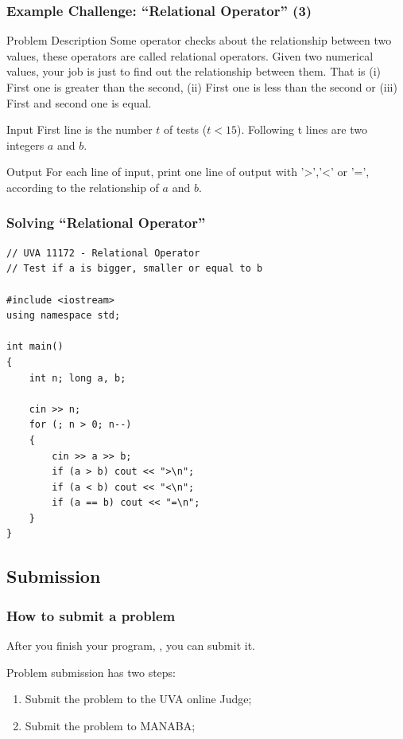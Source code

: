 \documentclass{beamer}
\begin{document}
\begin{frame}
  \frametitle{Example Challenge: ``Relational Operator'' (3)}
  
  \begin{block}{Problem Description}
    {\small 
      Some operator checks about the relationship between two values,
      these operators are called relational operators. Given two
      numerical values, your job is just to find out the relationship
      between them. That is (i) First one is greater than the second,
      (ii) First one is less than the second or (iii) First and second
      one is equal.
    }
  \end{block}
  \begin{block}{Input}
    {\small
      First line is the number $t$ of tests ($t < 15$). Following t lines 
      are two integers $a$ and $b$.
    }
  \end{block}
  \begin{block}{Output}
    {\small
      For each line of input, print one line of output with '>','<' or '=', 
      according to the relationship of $a$ and $b$.
    }
  \end{block}
\end{frame}



\begin{frame}
  \frametitle{Solving ``Relational Operator''}
    
\begin{block}{}
{\smaller
\begin{verbatim}
// UVA 11172 - Relational Operator
// Test if a is bigger, smaller or equal to b

#include <iostream>
using namespace std;

int main()
{
    int n; long a, b;

    cin >> n;    
    for (; n > 0; n--)
    {
        cin >> a >> b;
        if (a > b) cout << ">\n";
        if (a < b) cout << "<\n";
        if (a == b) cout << "=\n";
    }
}
\end{verbatim}}
\end{block}
\end{frame}

\subsection{Submission}

\begin{frame}
  \frametitle{How to submit a problem} 
  
  After you finish your program, , you can submit it.

  \bigskip

  Problem submission has two steps:
  \begin{enumerate}
    \item Submit the problem to the UVA online Judge;
    \item Submit the problem to MANABA;
  \end{enumerate}
\end{frame}
\end{document}
